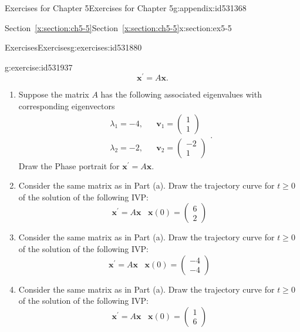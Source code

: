 \documentclass[oneside,10pt,]{book}
\newcommand{\xreffont}{\relax}
\numberwithin{equation}{section}
\numberwithin{equation}{section}
\newcommand{\amp}{&}
\begin{document}
\begin{appendixptx}{Exercises for Chapter 5}{}{Exercises for Chapter 5}{}{}{g:appendix:id531368}
\begin{sectionptx}{Section~{\xreffont\ref*{x:section:ch5-5}}}{}{Section~{\xreffont\ref*{x:section:ch5-5}}}{}{}{x:section:ex5-5}
\begin{exercises-subsection-numberless}{Exercises}{}{Exercises}{}{}{g:exercises:id531880}
\begin{divisionexercise}{2}{}{}{g:exercise:id531937}
\begin{equation*}
\mathbf{x}^{\prime}=A\mathbf{x}.
\end{equation*}
%
%
\begin{enumerate}[label=(\alph*)]
\item{}Suppose the matrix \(A\) has the following associated eigenvalues with corresponding eigenvectors%
\begin{equation*}
\begin{array}{ccc}
\lambda_{1}=-4, \amp  \amp \mathbf{v}_{1}=\left(\begin{array}{c}
1\\
1
\end{array}\right)\\
\lambda_{2}=-2, \amp  \amp \mathbf{v}_{2}=\left(\begin{array}{c}
-2\\
1
\end{array}\right)
\end{array}.
\end{equation*}
Draw the Phase portrait for \(\mathbf{x}^{\prime}=A\mathbf{x}\).%
\item{}Consider the same matrix as in Part (a). Draw the trajectory curve for \(t\geq0 \) of the solution of the following IVP:%
\begin{equation*}
\mathbf{x}^{\prime}=A\mathbf{x}\,\,\,\,\,\mathbf{x}(0)=\left(\begin{array}{c}
6\\
2
\end{array}\right)
\end{equation*}
%
\item{}Consider the same matrix as in Part (a). Draw the trajectory curve for \(t\geq0\) of the solution of the following IVP:%
\begin{equation*}
\mathbf{x}^{\prime}=A\mathbf{x}\,\,\,\,\,\mathbf{x}(0)=\left(\begin{array}{c}
-4\\
-4
\end{array}\right)
\end{equation*}
%
\item{}Consider the same matrix as in Part (a). Draw the trajectory curve for \(t\geq0\) of the solution of the following IVP:%
\begin{equation*}
\mathbf{x}^{\prime}=A\mathbf{x}\,\,\,\,\,\mathbf{x}(0)=\left(\begin{array}{c}
1\\
6
\end{array}\right)
\end{equation*}

\end{enumerate}
\end{divisionexercise}
\end{exercises-subsection-numberless}
\end{sectionptx}
\end{appendixptx}
\end{document}
